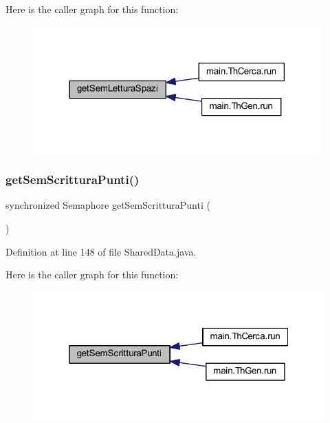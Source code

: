 Here is the caller graph for this function\+:
\nopagebreak
\begin{figure}[H]
\begin{center}
\leavevmode
\includegraphics[width=314pt]{classmain_1_1_shared_data_a218db8263ccc5317ba83f2e4ad2d49c8_icgraph}
\end{center}
\end{figure}
\mbox{\label{classmain_1_1_shared_data_ae0afb630593f701a83c77bc1ecc12e7b}} 
\subsubsection{\texorpdfstring{get\+Sem\+Scrittura\+Punti()}{getSemScritturaPunti()}}
{\footnotesize\ttfamily synchronized Semaphore get\+Sem\+Scrittura\+Punti (\begin{DoxyParamCaption}{ }\end{DoxyParamCaption})}



Definition at line 148 of file Shared\+Data.\+java.

Here is the caller graph for this function\+:
\nopagebreak
\begin{figure}[H]
\begin{center}
\leavevmode
\includegraphics[width=319pt]{classmain_1_1_shared_data_ae0afb630593f701a83c77bc1ecc12e7b_icgraph}
\end{center}
\end{figure}
\mbox{\label{classmain_1_1_shared_data_a10670dfbf4c72ab35617e5ee0d73271d}} 
